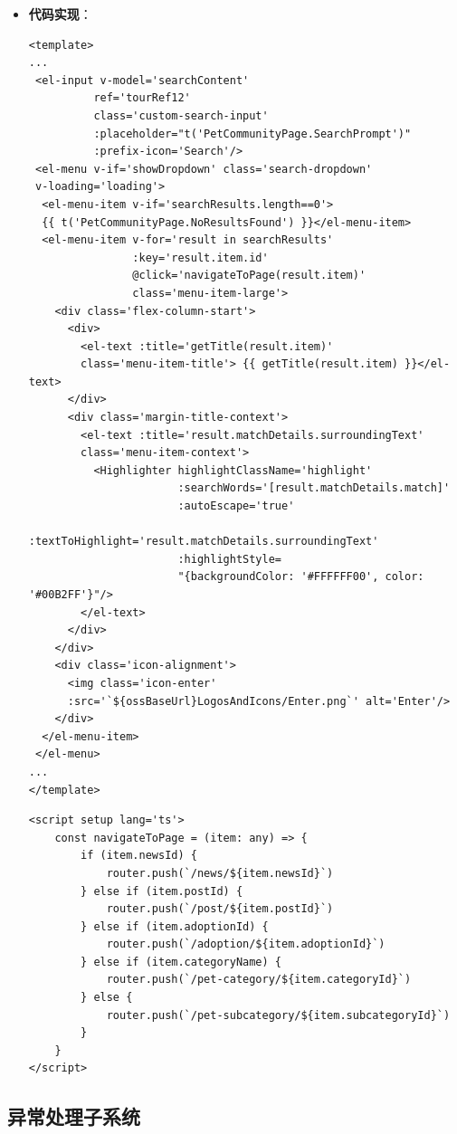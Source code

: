 \begin{itemize}
	\item \textbf{代码实现}：
	\begin{verbatim}
<template>
...
 <el-input v-model='searchContent'
          ref='tourRef12'
          class='custom-search-input'
          :placeholder="t('PetCommunityPage.SearchPrompt')"
          :prefix-icon='Search'/>
 <el-menu v-if='showDropdown' class='search-dropdown' 
 v-loading='loading'>
  <el-menu-item v-if='searchResults.length==0'>
  {{ t('PetCommunityPage.NoResultsFound') }}</el-menu-item>
  <el-menu-item v-for='result in searchResults'
                :key='result.item.id'
                @click='navigateToPage(result.item)'
                class='menu-item-large'>
    <div class='flex-column-start'>
      <div>
        <el-text :title='getTitle(result.item)' 
        class='menu-item-title'> {{ getTitle(result.item) }}</el-text>
      </div>
      <div class='margin-title-context'>
        <el-text :title='result.matchDetails.surroundingText' 
        class='menu-item-context'>
          <Highlighter highlightClassName='highlight'
                       :searchWords='[result.matchDetails.match]'
                       :autoEscape='true'
                       :textToHighlight='result.matchDetails.surroundingText'
                       :highlightStyle=
                       "{backgroundColor: '#FFFFFF00', color: '#00B2FF'}"/>
        </el-text>
      </div>
    </div>
    <div class='icon-alignment'>
      <img class='icon-enter' 
      :src='`${ossBaseUrl}LogosAndIcons/Enter.png`' alt='Enter'/>
    </div>
  </el-menu-item>
 </el-menu>
...
</template>
	\end{verbatim}
	
	\begin{verbatim}
<script setup lang='ts'>
	const navigateToPage = (item: any) => {
		if (item.newsId) {
			router.push(`/news/${item.newsId}`)
		} else if (item.postId) {
			router.push(`/post/${item.postId}`)
		} else if (item.adoptionId) {
			router.push(`/adoption/${item.adoptionId}`)
		} else if (item.categoryName) {
			router.push(`/pet-category/${item.categoryId}`)
		} else {
			router.push(`/pet-subcategory/${item.subcategoryId}`)
		}
	}
</script>
	\end{verbatim}
\end{itemize}

\subsection{异常处理子系统}

